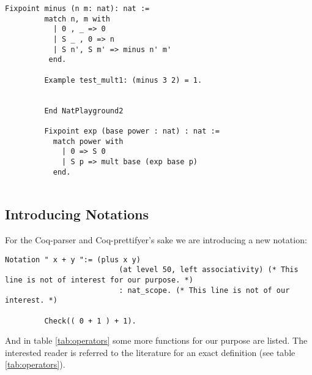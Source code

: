 	   \begin{lstlisting}[label = lst:minus_nat, caption={ \lstinline!minus! and \lstinline!exp!}]
	    Fixpoint minus (n m: nat): nat :=
	     match n, m with
	       | 0 , _ => 0
	       | S _ , 0 => n
	       | S n', S m' => minus n' m'
	      end.
	      
	     Example test_mult1: (minus 3 2) = 1.
	     
	      
	     End NatPlayground2
	     
	     Fixpoint exp (base power : nat) : nat :=
	       match power with
	         | 0 => S 0
	         | S p => mult base (exp base p)
	       end.
	         
	   \end{lstlisting}
	   
   \subsection{Introducing Notations}
   \label{subsec:IntroducingNotations}
	
	    For the Coq-parser and Coq-prettifyer's sake we are introducing a new notation:
	    
	    \begin{lstlisting}[caption= operator overloading of \lstinline!+!] 
	     Notation " x + y ":= (plus x y)
	                      (at level 50, left associativity) (* This line is not of interest for our purpose. *)
	                      : nat_scope. (* This line is not of our interest. *)
	                      
	     Check(( 0 + 1 ) + 1).
	    \end{lstlisting}    
	   And in table \ref{tab:operators} some more functions for our purpose are listed.
	   The interested reader is referred to the literature for an exact definition (see table \ref{tab:operators}).  
	   
